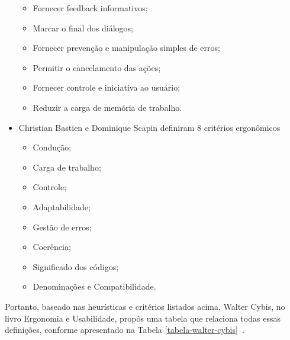 \begin{itemize}
\begin{itemize}
    \item Fornecer feedback informativos;

    \item Marcar o final dos diálogos;

    \item Fornecer prevenção e manipulação simples de erros;

    \item Permitir o cancelamento das ações;

    \item Fornecer controle e iniciativa ao usuário;

    \item Reduzir a carga de memória de trabalho.

    \end{itemize}

\item Christian Bastien e Dominique Scapin definiram 8 critérios ergonômicos~\cite{bastien1993}

    \begin{itemize}

    \item Condução;

    \item Carga de trabalho;

    \item Controle;

    \item Adaptabilidade;

    \item Gestão de erros;

    \item Coerência;

    \item Significado dos códigos;

    \item Denominações e Compatibilidade.

    \end{itemize}

\end{itemize}

Portanto, baseado nas heurísticas e critérios listados acima,  Walter Cybis, no
livro Ergonomia e Usabilidade, propôs uma tabela que relaciona todas essas
definições, conforme apresentado na Tabela \ref{tabela-walter-cybis}~\cite{cybis2010}.

